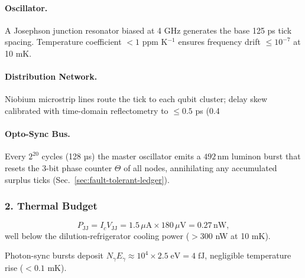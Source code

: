 \documentclass[11pt,oneside]{book}
\begin{document}
\begin{center}
\end{center}

\paragraph{Oscillator.}
A Josephson junction resonator biased at 4 GHz generates the base
125 ps tick spacing.  
Temperature coefficient $<1$ ppm K$^{-1}$ ensures frequency drift
$\le10^{-7}$ at 10 mK.

\paragraph{Distribution Network.}
Niobium microstrip lines route the tick to each qubit cluster;
delay skew calibrated with time-domain reflectometry to
$\le0.5$ ps (0.4 %

\paragraph{Opto-Sync Bus.}
Every $2^{20}$ cycles (128 µs) the master oscillator emits a
$492\,$nm luminon burst that resets the 3-bit phase counter
$\Theta$ of all nodes, annihilating any accumulated surplus ticks
(Sec.~\ref{sec:fault-tolerant-ledger}).

\subsubsection*{2. Thermal Budget}

\[
   P_{\text{JJ}}
   = I_c V_{\text{JJ}}
   = 1.5\,\mu\text{A}\times180\,\mu\text{V} = 0.27\,\text{nW},
\]
well below the dilution‐refrigerator cooling power
(\(>300\) nW at 10 mK).

Photon-sync bursts deposit
\(N_\gamma E_\gamma \approx 10^4\times2.5\;\text{eV}=4\;\text{fJ}\),
negligible temperature rise (\(<0.1\) mK).
\end{document}
